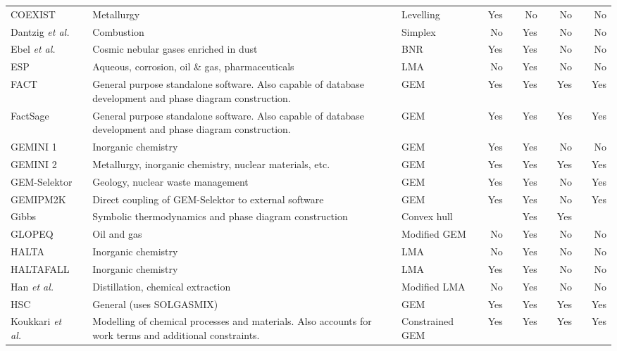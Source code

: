 \begin{landscape}
\begin{longtable}{@{}p{}cp{}clcrcrcrcr@{}}
		COEXIST \cite{Ahafat:1992aa} && {Metallurgy} && Levelling && Yes && No && No && No\\
		Dantzig \textit{et al.} \cite{Dantzig:1958aa}&& {Combustion} && Simplex && No && Yes && No && No\\
		Ebel \textit{et al.} \cite{Ebel:2000aa}&& {Cosmic nebular gases enriched in dust} && BNR && Yes && Yes && No && No\\
		ESP \cite{Rafal:2003aa}&& {Aqueous, corrosion, oil \& gas, pharmaceuticals} && LMA && No && Yes && No && No\\
		FACT \cite{Thompson83} && {General purpose standalone software. Also capable of database development and phase diagram construction.} && GEM && Yes && Yes && Yes && Yes\\
		FactSage \cite{Bale83} && {General purpose standalone software. Also capable of database development and phase diagram construction.} && GEM && Yes && Yes && Yes && Yes\\
		GEMINI 1 \cite{Cheynet09} && {Inorganic chemistry} && GEM && Yes && Yes && No && No\\
		GEMINI 2 \cite{Cheynet09} && {Metallurgy, inorganic chemistry, nuclear materials, etc.} && GEM && Yes && Yes && Yes && Yes\\
		GEM-Selektor \cite{Karpov:aa}&& {Geology, nuclear waste management} && GEM && Yes && Yes && No && Yes\\
		GEMIPM2K \cite{Karpov:aa} && {Direct coupling of GEM-Selektor to external software} && GEM && Yes && Yes && No && Yes\\
		Gibbs \cite{COOL2010393}&& {Symbolic thermodynamics and phase diagram construction} && Convex hull && {} && Yes && Yes && {}\\
		GLOPEQ \cite{MCDONALD19971} && {Oil and gas} && Modified GEM && No && Yes && No && No\\
		HALTA \cite{Sillen:1962aa} && {Inorganic chemistry} && LMA && No && Yes && No && No\\
		HALTAFALL \cite{INGRI19671261} && {Inorganic chemistry} && LMA && Yes && Yes && No && No\\
		Han \textit{et al.} \cite{HAN1998897}&& {Distillation, chemical extraction} && Modified LMA && No && Yes && No && No\\
		HSC \cite{HSCSoftware:aa} && {General (uses SOLGASMIX)} && GEM && Yes && Yes && Yes && Yes\\
		Koukkari \textit{et al.} \cite{KOUKKARI200618} && {Modelling of chemical processes and materials. Also accounts for work terms and additional constraints.} && Constrained GEM && Yes && Yes && Yes && Yes\\

\end{longtable}
\end{landscape}
